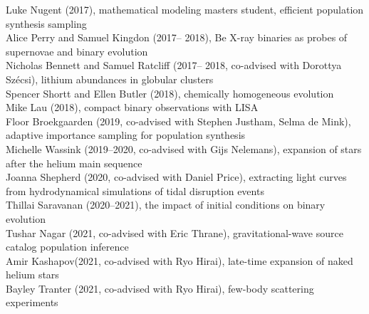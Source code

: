 \documentclass[margin,line]{res}
\begin{document}
\begin{resume}
Luke Nugent (2017), mathematical modeling masters student, efficient population synthesis sampling\\
Alice Perry and Samuel Kingdon (2017-- 2018), Be X-ray binaries as probes of supernovae and binary evolution\\
Nicholas Bennett and Samuel Ratcliff (2017-- 2018, co-advised with Dorottya Sz\'{e}csi), lithium abundances in globular clusters\\ 
Spencer Shortt and Ellen Butler (2018), chemically homogeneous evolution\\
Mike Lau (2018), compact binary observations with LISA\\
Floor Broekgaarden (2019, co-advised with Stephen Justham, Selma de Mink), adaptive importance sampling for population synthesis\\
Michelle Wassink (2019--2020, co-advised with Gijs Nelemans), expansion of stars after the helium main sequence\\
Joanna Shepherd (2020, co-advised with Daniel Price), extracting light curves from hydrodynamical simulations of tidal disruption events\\
Thillai Saravanan (2020--2021), the impact of initial conditions on binary evolution\\
Tushar Nagar (2021, co-advised with Eric Thrane), gravitational-wave source catalog population inference\\
Amir Kashapov(2021, co-advised with Ryo Hirai), late-time expansion of naked helium stars\\
Bayley Tranter (2021, co-advised with Ryo Hirai), few-body scattering experiments\\
 




\end{resume}
\end{document}
